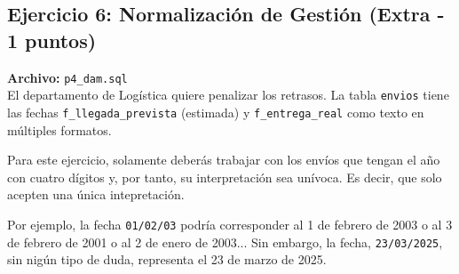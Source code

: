 \documentclass[12pt,a4paper]{article}
\begin{document}
\subsection{Ejercicio 6: Normalización de Gestión \textcolor{RA5}{(Extra - 1 puntos)}}
\textbf{Archivo:} \texttt{p4\_dam.sql} \\
El departamento de Logística quiere penalizar los retrasos. La tabla \texttt{envios} tiene las fechas \texttt{f\_llegada\_prevista} (estimada) y \texttt{f\_entrega\_real} como texto en múltiples formatos.

Para este ejercicio, solamente deberás trabajar con los envíos que tengan el año con cuatro dígitos y, por tanto, su interpretación sea unívoca. Es decir, que solo acepten una única intepretación. 

Por ejemplo, la fecha \texttt{01/02/03} podría corresponder al 1 de febrero de 2003 o al 3 de febrero de 2001 o al 2 de enero de 2003... Sin embargo, la fecha, \texttt{23/03/2025}, sin nigún tipo de duda, representa el 23 de marzo de 2025.
\end{document}
